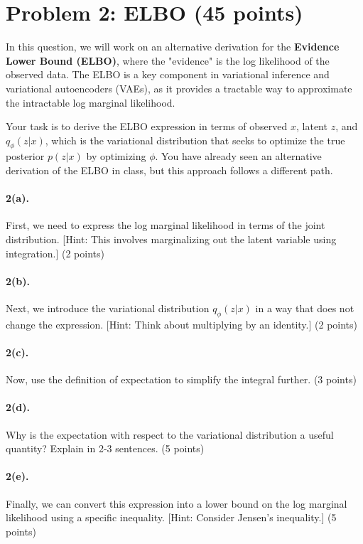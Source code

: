 \documentclass{article}
\begin{document}
\section*{Problem 2: ELBO (45 points)}
In this question, we will work on an alternative derivation for the \textbf{Evidence Lower Bound (ELBO)}, where the "evidence" is the log likelihood of the observed data. The ELBO is a key component in variational inference and variational autoencoders (VAEs), as it provides a tractable way to approximate the intractable log marginal likelihood.

Your task is to derive the ELBO expression in terms of observed $x$, latent $z$, and $q_\phi(z|x)$, which is the variational distribution that seeks to optimize the true posterior $p(z|x)$ by optimizing $\phi$. You have already seen an alternative derivation of the ELBO in class, but this approach follows a different path. 

\paragraph{2(a).} First, we need to express the log marginal likelihood in terms of the joint distribution. [Hint: This involves marginalizing out the latent variable using integration.] (2 points) \\


\paragraph{2(b).} Next, we introduce the variational distribution $q_\phi(z|x)$ in a way that does not change the expression. [Hint: Think about multiplying by an identity.] (2 points) \\


\paragraph{2(c).} Now, use the definition of expectation to simplify the integral further. (3 points) \\


\paragraph{2(d).} Why is the expectation with respect to the variational distribution a useful quantity? Explain in 2-3 sentences. (5 points)

   

\paragraph{2(e).} Finally, we can convert this expression into a lower bound on the log marginal likelihood using a specific inequality. [Hint: Consider Jensen's inequality.] (5 points) \\
\end{document}
